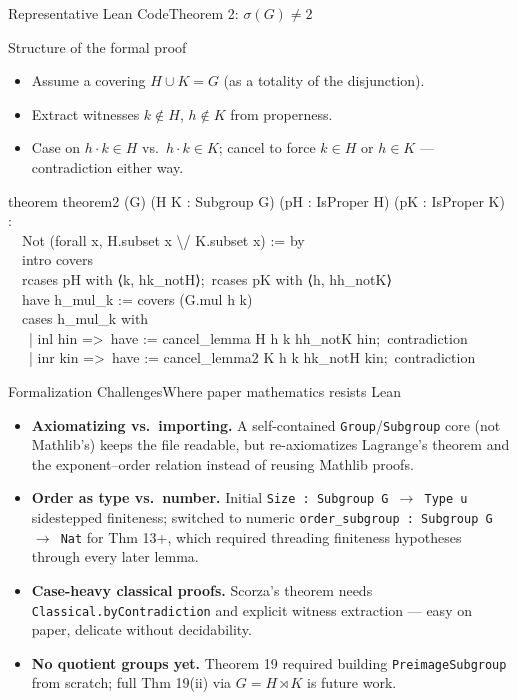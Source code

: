 \documentclass[9pt,aspectratio=169]{beamer}
\begin{document}
\begin{frame}[fragile]{Representative Lean Code}{Theorem 2: $\sigma(G) \ne 2$}
\begin{block}{Structure of the formal proof}
\begin{itemize}
\item Assume a covering $H \cup K = G$ (as a totality of the disjunction).
\item Extract witnesses $k \notin H$, $h\notin K$ from properness.
\item Case on $h\cdot k \in H$ vs.\ $h\cdot k \in K$; cancel to force $k\in H$ or $h\in K$ — contradiction either way.
\end{itemize}
\end{block}
\begin{center}
\begin{minipage}{0.92\textwidth}
\footnotesize
\ttfamily
theorem theorem2 (G) (H K : Subgroup G) (pH : IsProper H) (pK : IsProper K) :\\
\ \ Not (forall x, H.subset x \textbackslash{}/ K.subset x) := by\\
\ \ intro covers\\
\ \ rcases pH with ⟨k, hk\_notH⟩;\ rcases pK with ⟨h, hh\_notK⟩\\
\ \ have h\_mul\_k := covers (G.mul h k)\\
\ \ cases h\_mul\_k with\\
\ \ \ | inl hin =>\ have := cancel\_lemma H h k hh\_notK hin;\ contradiction\\
\ \ \ | inr kin =>\ have := cancel\_lemma2 K h k hk\_notH kin;\ contradiction
\end{minipage}
\end{center}
\end{frame}

\begin{frame}{Formalization Challenges}{Where paper mathematics resists Lean}
\begin{itemize}
\item \textbf{Axiomatizing vs.\ importing.} A self-contained \texttt{Group}/\texttt{Subgroup} core (not Mathlib's) keeps the file readable, but re-axiomatizes Lagrange's theorem and the exponent–order relation instead of reusing Mathlib proofs.
\item \textbf{Order as type vs.\ number.} Initial \texttt{Size : Subgroup G $\to$ Type u} sidestepped finiteness; switched to numeric \texttt{order\_subgroup : Subgroup G $\to$ Nat} for Thm 13+, which required threading finiteness hypotheses through every later lemma.
\item \textbf{Case-heavy classical proofs.} Scorza's theorem needs \texttt{Classical.byContradiction} and explicit witness extraction — easy on paper, delicate without decidability.
\item \textbf{No quotient groups yet.} Theorem 19 required building \texttt{PreimageSubgroup} from scratch; full Thm 19(ii) via $G=H\rtimes K$ is future work.
\end{itemize}
\end{frame}
\end{document}
